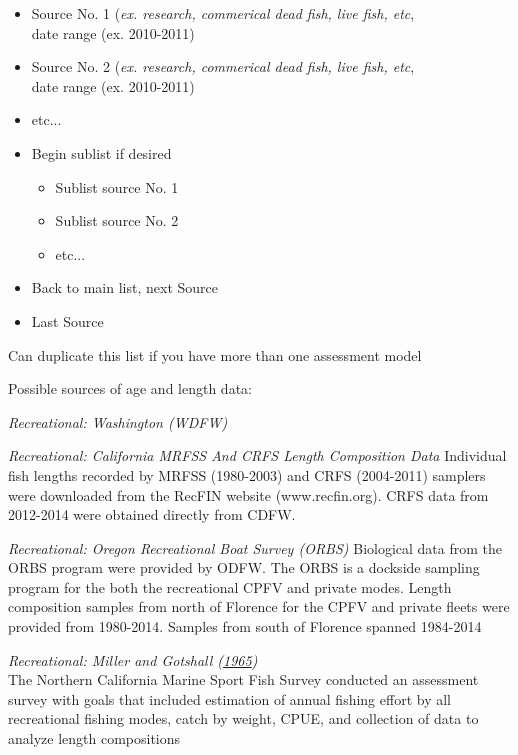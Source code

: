 \documentclass[12pt,]{article}
\begin{document}
\begin{itemize}[noitemsep,nolistsep,topsep=0pt]
  \item Source No. 1 (\emph{ex. research, commerical dead fish, live fish, etc},\\     
        date range (ex. 2010-2011)
  \item Source No. 2 (\emph{ex. research, commerical dead fish, live fish, etc},\\      
        date range (ex. 2010-2011) 
  \item etc...      
  \item Begin sublist if desired 
    \begin{itemize}[noitemsep,nolistsep]
      \item Sublist source No. 1     
      \item Sublist source No. 2        
      \item etc...     
    \end{itemize}
  \item Back to main list, next Source     
  \item Last Source     
\end{itemize}

Can duplicate this list if you have more than one assessment model

Possible sources of age and length data:

\emph{Recreational: Washington (WDFW)}

\emph{Recreational: California MRFSS And CRFS Length Composition Data}
Individual fish lengths recorded by MRFSS (1980-2003) and CRFS
(2004-2011) samplers were downloaded from the RecFIN website
(www.recfin.org). CRFS data from 2012-2014 were obtained directly from
CDFW.

\emph{Recreational: Oregon Recreational Boat Survey (ORBS)} Biological
data from the ORBS program were provided by ODFW. The ORBS is a dockside
sampling program for the both the recreational CPFV and private modes.
Length composition samples from north of Florence for the CPFV and
private fleets were provided from 1980-2014. Samples from south of
Florence spanned 1984-2014

\emph{Recreational: Miller and Gotshall
(\protect\hyperlink{ref-Miller1965}{1965})}\\
The Northern California Marine Sport Fish Survey conducted an assessment
survey with goals that included estimation of annual fishing effort by
all recreational fishing modes, catch by weight, CPUE, and collection of
data to analyze length compositions
\end{document}
